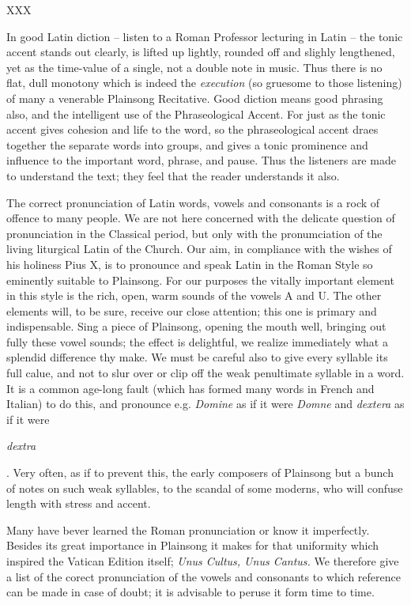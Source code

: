 {XXX

In good Latin diction -- listen to a Roman Professor lecturing in Latin -- the tonic accent stands out clearly, is lifted up lightly, rounded off and slighly lengthened, yet as the time-value of a single, not a double note in music. Thus there is no flat, dull monotony which is indeed the {\it execution} (so gruesome to those listening) of many a venerable Plainsong Recitative. Good diction means good phrasing also, and the intelligent use of the Phraseological Accent. For just as the tonic accent gives cohesion and life to the word, so the phraseological accent draes together the separate words into groups, and gives a tonic prominence and influence to the important word, phrase, and pause. Thus the listeners are made to understand the text; they feel that the reader understands it also.

The correct pronunciation of Latin words, vowels and consonants is a rock of offence to many people. We are not here concerned with the delicate question of pronunciation in the Classical period, but only with the pronumciation of the living liturgical Latin of the Church. Our aim, in compliance with the wishes of his holiness Pius X, is to pronounce and speak Latin in the Roman Style so eminently suitable to Plainsong. For our purposes the vitally important element in this style is the rich, open, warm sounds of the vowels A and U. The other elements will, to be sure, receive our close attention; this one is primary and indispensable. Sing a piece of Plainsong, opening the mouth well, bringing out fully these vowel sounds; the effect is delightful, we realize immediately what a splendid difference thy make. We must be careful also to give every syllable its full calue, and not to slur over or clip off the weak penultimate syllable in a word. It is a common age-long fault (which has formed many words in French and Italian) to do this, and pronounce e.g. {\it Domine} as if it were {\it Domne} and {\it dextera} as if it were {\it dextra{. Very often, as if to prevent this, the early composers of Plainsong but a bunch of notes on such weak syllables, to the scandal of some moderns, who will confuse length with stress and accent.

Many have bever learned the Roman pronunciation or know it imperfectly. Besides its great importance in Plainsong it makes for that uniformity which inspired the Vatican Edition itself; {\it Unus Cultus, Unus Cantus.} We therefore give a list of the corect pronunciation of the vowels and consonants to which reference can be made in case of doubt; it is advisable to peruse it form time to time.

}}}
